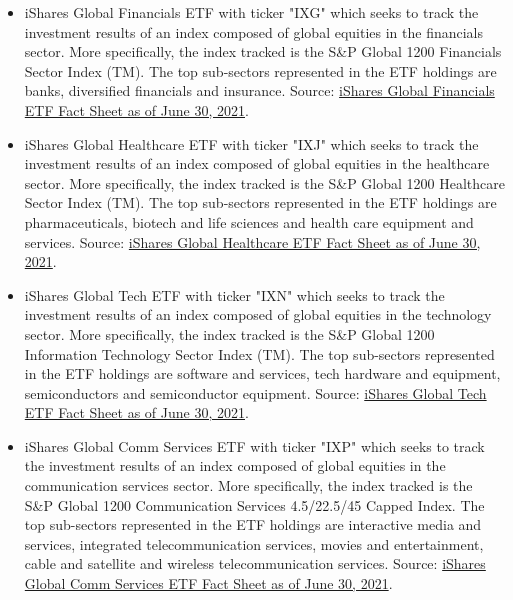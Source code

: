 \begin{itemize}
        \item iShares Global Financials ETF with ticker "IXG" which seeks to track the investment results of an index composed of global equities in the financials sector. More specifically, the index tracked is the S{\&}P Global 1200 Financials Sector Index (TM). The top sub-sectors represented in the ETF holdings are banks, diversified financials and insurance. Source: \href{https://www.ishares.com/us/literature/fact-sheet/ixg-ishares-global-financials-etf-fund-fact-sheet-en-us.pdf}{iShares Global Financials ETF Fact Sheet as of June 30, 2021}.%
        
        \item iShares Global Healthcare ETF with ticker "IXJ" which seeks to track the investment results of an index composed of global equities in the healthcare sector. More specifically, the index tracked is the S{\&}P Global 1200 Healthcare Sector Index (TM). The top sub-sectors represented in the ETF holdings are pharmaceuticals, biotech and life sciences and health care equipment and services. Source: \href{https://www.ishares.com/us/literature/fact-sheet/ixj-ishares-global-healthcare-etf-fund-fact-sheet-en-us.pdf}{iShares Global Healthcare ETF Fact Sheet as of June 30, 2021}.%
            
        \item iShares Global Tech ETF with ticker "IXN" which seeks to track the investment results of an index composed of global equities in the technology sector. More specifically, the index tracked is the S{\&}P Global 1200 Information Technology Sector Index (TM). The top sub-sectors represented in the ETF holdings are software and services, tech hardware and equipment, semiconductors and semiconductor equipment. Source: \href{https://www.ishares.com/us/literature/fact-sheet/ixn-ishares-global-tech-etf-fund-fact-sheet-en-us.pdf}{iShares Global Tech ETF Fact Sheet as of June 30, 2021}.%
        
        \item iShares Global Comm Services ETF with ticker "IXP" which seeks to track the investment results of an index composed of global equities in the communication services sector. More specifically, the index tracked is the S{\&}P Global 1200 Communication Services 4.5/22.5/45 Capped Index. The top sub-sectors represented in the ETF holdings are interactive media and services, integrated telecommunication services, movies and entertainment, cable and satellite and wireless telecommunication services. Source: \href{https://www.ishares.com/us/literature/fact-sheet/ixp-ishares-global-comm-services-etf-fund-fact-sheet-en-us.pdf}{iShares Global Comm Services ETF Fact Sheet as of June 30, 2021}.%
        

\end{itemize}
